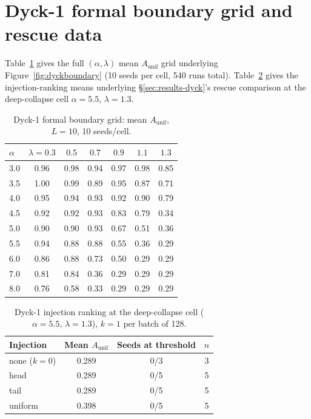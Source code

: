 \documentclass[11pt]{article}
\begin{document}
\section{Dyck-1 formal boundary grid and rescue data}
\label{app:dyck}
Table~\ref{tab:dyckboundary} gives the full $(\alpha,\lambda)$ mean $A_{\mathrm{unif}}$ grid underlying Figure~\ref{fig:dyckboundary} (10 seeds per cell, 540 runs total). Table~\ref{tab:dyckrescue} gives the injection-ranking means underlying \S\ref{sec:results-dyck}'s rescue comparison at the deep-collapse cell $\alpha=5.5$, $\lambda=1.3$.

\begin{table}[h]
\centering
\small
\caption{Dyck-1 formal boundary grid: mean $A_{\mathrm{unif}}$, $L=10$, 10 seeds/cell.}
\label{tab:dyckboundary}
\begin{tabular}{lcccccc}
\toprule
$\alpha$ & $\lambda{=}0.3$ & $0.5$ & $0.7$ & $0.9$ & $1.1$ & $1.3$ \\
\midrule
3.0 & 0.96 & 0.98 & 0.94 & 0.97 & 0.98 & 0.85 \\
3.5 & 1.00 & 0.99 & 0.89 & 0.95 & 0.87 & 0.71 \\
4.0 & 0.95 & 0.94 & 0.93 & 0.92 & 0.90 & 0.79 \\
4.5 & 0.92 & 0.92 & 0.93 & 0.83 & 0.79 & 0.34 \\
5.0 & 0.90 & 0.90 & 0.93 & 0.67 & 0.51 & 0.36 \\
5.5 & 0.94 & 0.88 & 0.88 & 0.55 & 0.36 & 0.29 \\
6.0 & 0.86 & 0.88 & 0.73 & 0.50 & 0.29 & 0.29 \\
7.0 & 0.81 & 0.84 & 0.36 & 0.29 & 0.29 & 0.29 \\
8.0 & 0.76 & 0.58 & 0.33 & 0.29 & 0.29 & 0.29 \\
\bottomrule
\end{tabular}
\end{table}

\begin{table}[h]
\centering
\small
\caption{Dyck-1 injection ranking at the deep-collapse cell ($\alpha=5.5$, $\lambda=1.3$), $k=1$ per batch of 128.}
\label{tab:dyckrescue}
\begin{tabular}{lccc}
\toprule
Injection & Mean $A_{\mathrm{unif}}$ & Seeds at threshold & $n$ \\
\midrule
none ($k=0$) & 0.289 & 0/3 & 3 \\
head & 0.289 & 0/5 & 5 \\
tail & 0.289 & 0/5 & 5 \\
uniform & 0.398 & 0/5 & 5 \\
\bottomrule
\end{tabular}
\end{table}
\end{document}
